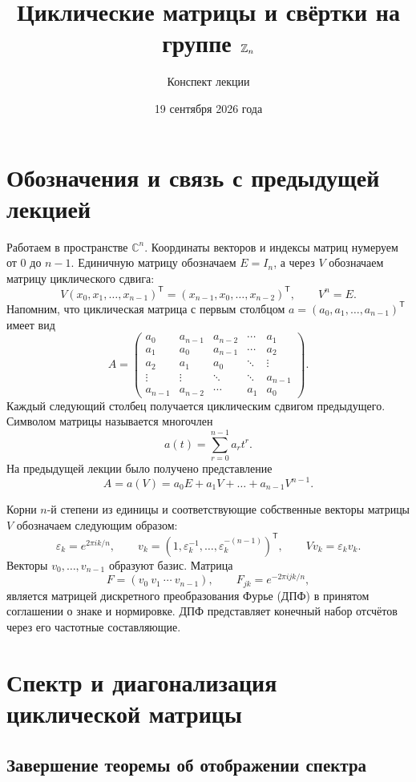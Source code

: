 \documentclass[12pt,a4paper]{article}
\title{Циклические матрицы и свёртки на группе $\mathbb{Z}_n$}
\author{Конспект лекции}
\date{19 сентября 2026 года}
\theoremstyle{definition}
\theoremstyle{remark}
\newcommand{\CC}{\mathbb{C}}
\newcommand{\eps}{\varepsilon}
\begin{document}
\maketitle

\section{Обозначения и связь с предыдущей лекцией}

Работаем в пространстве $\CC^n$. Координаты векторов и индексы матриц
нумеруем от $0$ до $n-1$. Единичную матрицу обозначаем $E=I_n$, а через
$V$ обозначаем матрицу циклического сдвига:
\[
  V(x_0,x_1,\dots,x_{n-1})^{\mathsf T}
  =(x_{n-1},x_0,\dots,x_{n-2})^{\mathsf T},
  \qquad V^n=E.
\]
Напомним, что циклическая матрица с первым столбцом
$a=(a_0,a_1,\dots,a_{n-1})^{\mathsf T}$ имеет вид
\[
  A=\begin{pmatrix}
    a_0 & a_{n-1} & a_{n-2} & \cdots & a_1\\
    a_1 & a_0 & a_{n-1} & \cdots & a_2\\
    a_2 & a_1 & a_0 & \ddots & \vdots\\
    \vdots & \vdots & \ddots & \ddots & a_{n-1}\\
    a_{n-1} & a_{n-2} & \cdots & a_1 & a_0
  \end{pmatrix}.
\]
Каждый следующий столбец получается циклическим сдвигом предыдущего.
Символом матрицы называется многочлен
\[
  a(t)=\sum_{r=0}^{n-1}a_rt^r.
\]
На предыдущей лекции было получено представление
\[
  A=a(V)=a_0E+a_1V+\dots+a_{n-1}V^{n-1}.
\]

Корни $n$-й степени из единицы и соответствующие собственные векторы
матрицы $V$ обозначаем следующим образом:
\[
  \eps_k=e^{2\pi i k/n},\qquad
  v_k=(1,\eps_k^{-1},\dots,\eps_k^{-(n-1)})^{\mathsf T},
  \qquad Vv_k=\eps_kv_k.
\]
Векторы $v_0,\dots,v_{n-1}$ образуют базис. Матрица
\[
  F=(v_0\ v_1\ \cdots\ v_{n-1}),\qquad
  F_{jk}=e^{-2\pi i jk/n},
\]
является матрицей дискретного преобразования Фурье (ДПФ) в принятом
соглашении о знаке и нормировке. ДПФ представляет конечный набор
отсчётов через его частотные составляющие.

\section{Спектр и диагонализация циклической матрицы}

\subsection{Завершение теоремы об отображении спектра}
\end{document}
